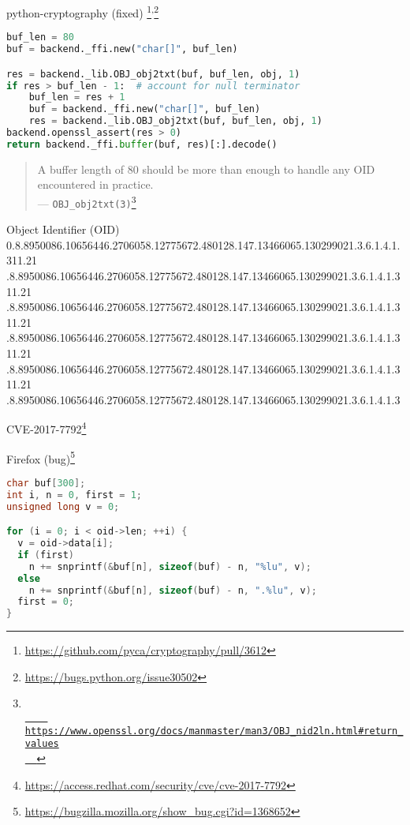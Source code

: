 \documentclass[ignorenonframetext,aspectratio=169,dvipsnames]{beamer}
\begin{document}
\begin{frame}[fragile]{python-cryptography (fixed)
  \footnote[frame,5]{
    \url{https://github.com/pyca/cryptography/pull/3612}
  }\textsuperscript{,}\footnote[frame,6]{
    \url{https://bugs.python.org/issue30502}
  }
}
\begin{lstlisting}[language=Python]
buf_len = 80
buf = backend._ffi.new("char[]", buf_len)

res = backend._lib.OBJ_obj2txt(buf, buf_len, obj, 1)
if res > buf_len - 1:  # account for null terminator
    buf_len = res + 1
    buf = backend._ffi.new("char[]", buf_len)
    res = backend._lib.OBJ_obj2txt(buf, buf_len, obj, 1)
backend.openssl_assert(res > 0)
return backend._ffi.buffer(buf, res)[:].decode()
\end{lstlisting}
\end{frame}

\begin{frame}
\Large
\begin{quote}
A buffer length of 80 should be more than enough to
handle any OID encountered in practice.\\
  {\hfill --- \tt OBJ\_obj2txt(3)\footnote[frame]{\url{
    https://www.openssl.org/docs/manmaster/man3/OBJ_nid2ln.html\#return_values
  }}}
\end{quote}
\end{frame}

\begin{frame}{Object Identifier (OID)}
  0.8.8950086.10656446.2706058.12775672.480128.147.13466065.130299021.3.6.1.4.1.311.21
   .8.8950086.10656446.2706058.12775672.480128.147.13466065.130299021.3.6.1.4.1.311.21
   .8.8950086.10656446.2706058.12775672.480128.147.13466065.130299021.3.6.1.4.1.311.21
   .8.8950086.10656446.2706058.12775672.480128.147.13466065.130299021.3.6.1.4.1.311.21
   .8.8950086.10656446.2706058.12775672.480128.147.13466065.130299021.3.6.1.4.1.311.21
   .8.8950086.10656446.2706058.12775672.480128.147.13466065.130299021.3.6.1.4.1.3
\end{frame}

\begin{frame}[plain]
\huge
  CVE-2017-7792\footnote[frame]{
    \url{https://access.redhat.com/security/cve/cve-2017-7792}
  }
\end{frame}

\begin{frame}[fragile]{Firefox (bug)\footnote[frame]{
    \url{https://bugzilla.mozilla.org/show_bug.cgi?id=1368652}
  }}
\begin{lstlisting}[language=C++]
char buf[300];
int i, n = 0, first = 1;
unsigned long v = 0;

for (i = 0; i < oid->len; ++i) {
  v = oid->data[i];
  if (first)
    n += snprintf(&buf[n], sizeof(buf) - n, "%lu", v);
  else
    n += snprintf(&buf[n], sizeof(buf) - n, ".%lu", v);
  first = 0;
}
\end{lstlisting}
\end{frame}
\end{document}
